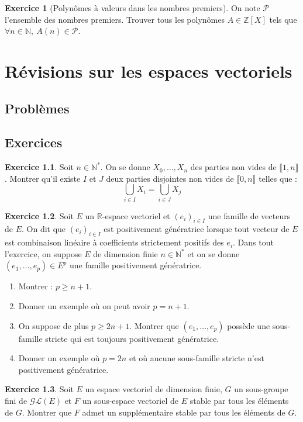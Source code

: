 \documentclass[french]{book}
\newcommand{\N}{\mathbb{N}}
\newcommand{\Z}{\mathbb{Z}}
\newcommand{\R}{\mathbb{R}}
\newcommand{\st}{^*}
\theoremstyle{definition}
\newtheorem{ex}{Exercice}[chapter]
\begin{document}
\begin{ex}[Polynômes à valeurs dans les nombres premiers]
	On note $\mathcal{P}$ l'ensemble des nombres premiers. Trouver tous les polynômes $A \in \Z[X]$ tels que $\forall n \in \N, \ A(n) \in \mathcal{P}$.
\end{ex}

\chapter{Révisions sur les espaces vectoriels}

\section{Problèmes}

\section{Exercices}

\begin{ex}
	Soit $n\in\N\st$. On se donne $X_0,\ldots,X_n$ des parties non vides de $\llbracket1,n\rrbracket$. Montrer qu'il existe $I$ et $J$ deux parties disjointes non vides de $\llbracket0,n\rrbracket$ telles que : $$\bigcup_{i\in I} X_i=\bigcup_{i\in J} X_j$$
\end{ex}

\begin{ex}
	Soit $E$ un $\R$-espace vectoriel et $(e_i)_{i\in I}$ une famille de vecteurs de $E$. On dit que $(e_i)_{i\in I}$ est positivement génératrice lorsque tout vecteur de $E$ est combinaison linéaire à coefficients strictement positifs des $e_i$. Dans tout l'exercice, on suppose $E$ de dimension finie $n\in\N\st$ et on se donne $(e_1,\ldots,e_p)\in E^p$ une famille positivement génératrice.
	\begin{enumerate}
		\item Montrer : $p\geqslant n+1$.
		\item Donner un exemple où on peut avoir $p=n+1$.
		\item On suppose de plus $p\geqslant 2n+1$. Montrer que $(e_1,\ldots,e_p)$ possède une sous-famille stricte qui est toujours positivement génératrice.
		\item Donner un exemple où $p=2n$ et où aucune sous-famille stricte n'est positivement génératrice.
	\end{enumerate}
\end{ex}

\begin{ex}
	Soit $E$ un espace vectoriel de dimension finie, $G$ un sous-groupe fini de $\mathcal{GL}(E)$ et $F$ un sous-espace vectoriel de $E$ stable par tous les éléments de $G$. Montrer que $F$ admet un supplémentaire stable par tous les éléments de $G$.
\end{ex}
\end{document}
